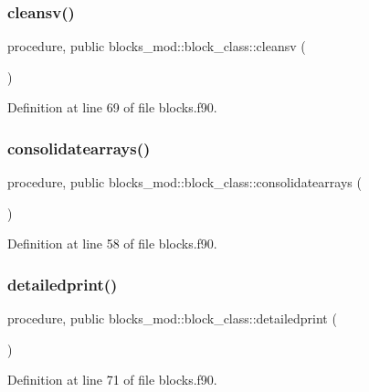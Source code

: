 \subsubsection{\texorpdfstring{cleansv()}{cleansv()}}
{\footnotesize\ttfamily procedure, public blocks\+\_\+mod\+::block\+\_\+class\+::cleansv (\begin{DoxyParamCaption}{ }\end{DoxyParamCaption})}



Definition at line 69 of file blocks.\+f90.

\mbox{\label{structblocks__mod_1_1block__class_a68f5bb0cb32b5b51cffd66d472cc45f0}} 
\subsubsection{\texorpdfstring{consolidatearrays()}{consolidatearrays()}}
{\footnotesize\ttfamily procedure, public blocks\+\_\+mod\+::block\+\_\+class\+::consolidatearrays (\begin{DoxyParamCaption}{ }\end{DoxyParamCaption})}



Definition at line 58 of file blocks.\+f90.

\mbox{\label{structblocks__mod_1_1block__class_a937d8dca8393460bc718dafa8a5c03ac}} 
\subsubsection{\texorpdfstring{detailedprint()}{detailedprint()}}
{\footnotesize\ttfamily procedure, public blocks\+\_\+mod\+::block\+\_\+class\+::detailedprint (\begin{DoxyParamCaption}{ }\end{DoxyParamCaption})}



Definition at line 71 of file blocks.\+f90.

